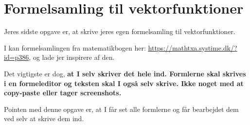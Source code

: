 \documentclass[a4paper, 12pt]{article}
\begin{document}
\newpage

\section*{Formelsamling til vektorfunktioner}
\label{sec:org555e88d}

Jeres sidste opgave er, at skrive jeres egen formelsamling til vektorfunktioner.

I kan formelsamlingen fra matematikbogen her: \url{https://mathtxa.systime.dk/?id=p386}, og lade jer inspirere af den.

Det vigtigste er dog, \textbf{at I selv skriver det hele ind. Formlerne skal skrives i en formeleditor og teksten skal I også selv skrive. Ikke noget med at copy-paste eller tager screenshots.}

Pointen med denne opgave er, at I får set alle formlerne og får bearbejdet dem ved selv at skrive dem ind.
\end{document}
